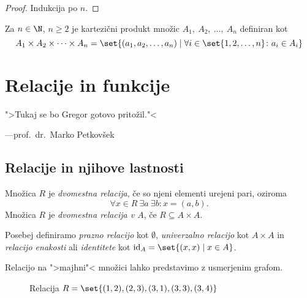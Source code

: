 \documentclass[12pt, a4paper]{article}
\begin{document}
\begin{proof}
Indukcija po $n$.
\end{proof}

\begin{definicija}
Za $n\in\N$, $n\geq 2$ je kartezični produkt množic $A_1,~A_2,~\dots,~A_n$ definiran kot
\[
A_1\times A_2\times\dots\times A_n=\set{(a_1,a_2,\dots,a_n)\mid\forall i\in\set{1,2,\dots,n}\colon a_i\in A_i}
\]
\end{definicija}

\newpage

\section{Relacije in funkcije}

\epigraph{">Tukaj se bo Gregor gotovo pritožil."<}{---prof.~dr.~Marko Petkovšek}

\subsection{Relacije in njihove lastnosti}

\begin{okvir}
\begin{definicija}
Množica $R$ je \emph{dvomestna relacija}, če so njeni elementi urejeni pari, oziroma
\[
\forall x\in R~\exists a~\exists b\colon x=(a,b).
\]
Množica $R$ je \emph{dvomestna relacija v $A$}, če $R\subseteq A\times A$.
\end{definicija}
\end{okvir}

Posebej definiramo \emph{prazno relacijo} kot $\emptyset$, \emph{univerzalno relacijo} kot $A\times A$ in \emph{relacijo enakosti} ali \emph{identitete} kot $\text{id}_A=\set{(x,x)\mid x\in A}$.

Relacijo na ">majhni"< množici lahko predstavimo z usmerjenim grafom.

\begin{figure}[H]
\centering
{}
\caption{Relacija $R=\set{(1,2),(2,3),(3,1),(3,3),(3,4)}$}
\end{figure}
\end{document}
